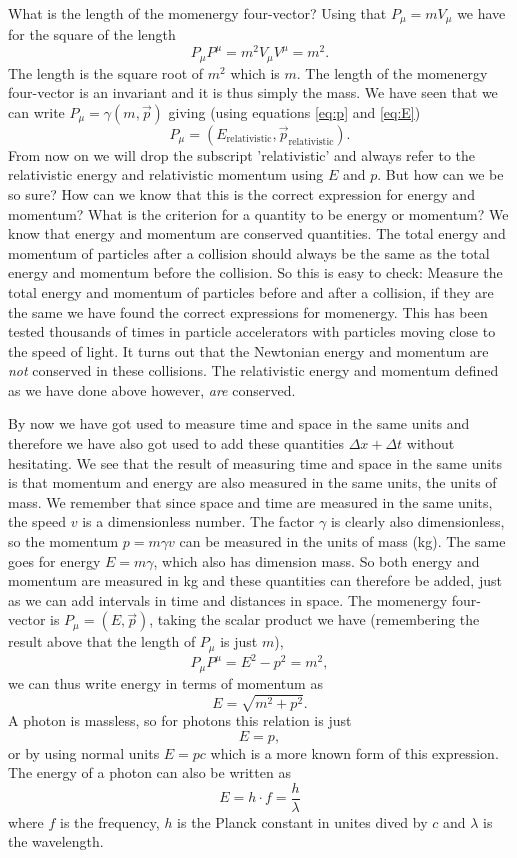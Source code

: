 {\begin{multicols}{2}
What is the length of the momenergy four-vector? Using that $P_\mu=mV_\mu$ we have for the square of the length
\[
P_\mu P^\mu=m^2V_\mu V^\mu=m^2.
\]
The length is the square root of $m^2$ which is $m$. The length of the momenergy four-vector is an invariant and it is thus simply the mass. We have seen that we can write $P_\mu=\gamma(m,\vec{p})$ giving (using equations \ref{eq:p} and \ref{eq:E})
\[
P_\mu=(E_\mathrm{relativistic},\vec{p}_\mathrm{relativistic}).
\]
From now on we will drop the subscript 'relativistic' and always refer to the relativistic energy and relativistic momentum using $E$ and $p$. But how can we be so sure? How can we know that this is the correct expression for energy and momentum? What is the criterion for a quantity to be energy or momentum? We know that energy and momentum are conserved quantities. The total energy and momentum of particles after a collision should always be the same as the total energy and momentum before the collision. So this is easy to check: Measure the total energy and momentum of particles before and after a collision, if they are the same we have found the correct expressions for momenergy. This has been tested thousands of times in particle accelerators with particles moving close to the speed of light. It turns out that the Newtonian energy and momentum are \emph{not} conserved in these collisions. The relativistic energy and momentum defined as we have done above however, \emph{are} conserved.

By now we have got used to measure time and space in the same units and therefore we have also got used to add these quantities $\Delta x+\Delta t$ without hesitating. We see that the result of measuring time and space in the same units is that momentum and energy are also measured in the same units, the units of mass. We remember that since space and time are measured in the same units, the speed $v$ is a dimensionless number. The factor $\gamma$ is clearly also dimensionless, so the momentum $p=m\gamma v$ can be measured in the units of mass (kg). The same goes for energy $E=m\gamma$, which also has dimension mass. So both energy and momentum are measured in kg and these quantities can therefore be added, just as we can add intervals in time and distances in space. The momenergy four-vector is $P_\mu=(E,\vec{p})$, taking the scalar product we have (remembering the result above that the length of $P_\mu$ is just $m$),
\[
P_\mu P^\mu=E^2-p^2=m^2,
\]
we can thus write energy in terms of momentum as
\[
E=\sqrt{m^2+p^2}.
\]
A photon is massless, so for photons this relation is just
\[
E=p,
\]
or by using normal units $E=pc$ which is a more known form of this expression. The energy of a photon can also be written as
\begin{equation}
E=h\cdot f=\dfrac{h}{\lambda}
\end{equation}
where $f$ is the frequency, $h$ is the Planck constant in unites dived by $c$ and $\lambda$ is the wavelength.


\end{multicols}}
